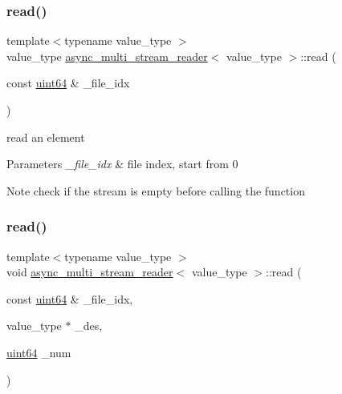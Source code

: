 \subsubsection{\texorpdfstring{read()}{read()}\hspace{0.1cm}{\footnotesize\ttfamily [1/2]}}
{\footnotesize\ttfamily template$<$typename value\+\_\+type $>$ \\
value\+\_\+type \hyperlink{classasync__multi__stream__reader}{async\+\_\+multi\+\_\+stream\+\_\+reader}$<$ value\+\_\+type $>$\+::read (\begin{DoxyParamCaption}\item[{const \hyperlink{types_8h_a60e8696a4678cd348e991a1f172e53f7}{uint64} \&}]{\+\_\+file\+\_\+idx }\end{DoxyParamCaption})\hspace{0.3cm}{\ttfamily [inline]}}



read an element 


\begin{DoxyParams}{Parameters}
{\em \+\_\+file\+\_\+idx} & file index, start from 0 \\
\hline
\end{DoxyParams}
\begin{DoxyNote}{Note}
check if the stream is empty before calling the function 
\end{DoxyNote}
\mbox{\label{classasync__multi__stream__reader_a1b4db036726c5b33edf9cdca1ccc24d9}} 
\subsubsection{\texorpdfstring{read()}{read()}\hspace{0.1cm}{\footnotesize\ttfamily [2/2]}}
{\footnotesize\ttfamily template$<$typename value\+\_\+type $>$ \\
void \hyperlink{classasync__multi__stream__reader}{async\+\_\+multi\+\_\+stream\+\_\+reader}$<$ value\+\_\+type $>$\+::read (\begin{DoxyParamCaption}\item[{const \hyperlink{types_8h_a60e8696a4678cd348e991a1f172e53f7}{uint64} \&}]{\+\_\+file\+\_\+idx,  }\item[{value\+\_\+type $\ast$}]{\+\_\+des,  }\item[{\hyperlink{types_8h_a60e8696a4678cd348e991a1f172e53f7}{uint64}}]{\+\_\+num }\end{DoxyParamCaption})\hspace{0.3cm}{\ttfamily [inline]}}



